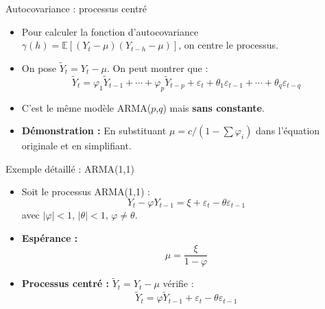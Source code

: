 \documentclass[11pt,aspectratio=169]{beamer}
\newcommand{\E}{\mathbb{E}}
\begin{document}
\begin{frame}{Autocovariance : processus centré}

\begin{itemize}

\item Pour calculer la fonction d'autocovariance $\gamma(h) = \E[(Y_t - \mu)(Y_{t-h} - \mu)]$, on centre le processus.\newline

\item On pose $\tilde{Y}_t = Y_t - \mu$. On peut montrer que :
\[
\tilde{Y}_t = \varphi_1 \tilde{Y}_{t-1} + \cdots + \varphi_p \tilde{Y}_{t-p} + \varepsilon_t + \theta_1 \varepsilon_{t-1} + \cdots + \theta_q \varepsilon_{t-q}
\]

\item C'est le même modèle ARMA($p$,$q$) mais \textbf{sans constante}.\newline

\item \textbf{Démonstration :} En substituant $\mu = c/(1 - \sum \varphi_i)$ dans l'équation originale et en simplifiant.

\end{itemize}
\end{frame}

\begin{frame}{Exemple détaillé : ARMA(1,1)}

\begin{itemize}

\item Soit le processus ARMA(1,1) :
\[
Y_t - \varphi Y_{t-1} = \xi + \varepsilon_t - \theta \varepsilon_{t-1}
\]
avec $|\varphi| < 1$, $|\theta| < 1$, $\varphi \neq \theta$.\newline

\item \textbf{Espérance :}
\[
\mu = \frac{\xi}{1 - \varphi}
\]

\item \textbf{Processus centré :} $\tilde{Y}_t = Y_t - \mu$ vérifie :
\[
\tilde{Y}_t = \varphi \tilde{Y}_{t-1} + \varepsilon_t - \theta \varepsilon_{t-1}
\]

\end{itemize}
\end{frame}
\end{document}
